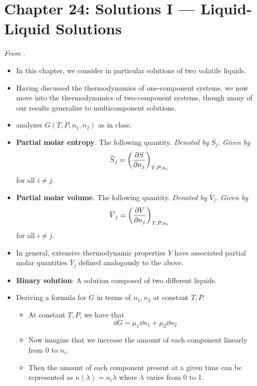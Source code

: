 \documentclass[../notes.tex]{subfiles}
\begin{document}
\section{Chapter 24: Solutions I --- Liquid-Liquid Solutions}
\emph{From \textcite{bib:McQuarrieSimon}.}
\begin{itemize}
    \item {}In this chapter, we consider in particular solutions of two volatile liquids.
    \item Having discussed the thermodynamics of one-component systems, we now move into the thermodynamics of two-component systems, though many of our results generalize to multicomponent solutions.
    \item \textcite{bib:McQuarrieSimon} analyzes $G(T,P,n_1,n_2)$ as in class.
    \item \textbf{Partial molar entropy}. The following quantity. \emph{Denoted by} $\overline{S}_j$. \emph{Given by}
    \begin{equation*}
        \overline{S}_j = \left( \pdv{S}{n_j} \right)_{T,P,n_i}
    \end{equation*}
    for all $i\neq j$.
    \item \textbf{Partial molar volume}. The following quantity. \emph{Denoted by} $\overline{V}_j$. \emph{Given by}
    \begin{equation*}
        \overline{V}_j = \left( \pdv{V}{n_j} \right)_{T,P,n_i}
    \end{equation*}
    for all $i\neq j$.
    \item In general, extensive thermodynamic properties $Y$ have associated partial molar quantities $\overline{Y}_j$ defined analogously to the above.
    \item \textbf{Binary solution}: A solution composed of two different liquids.
    \item {}Deriving a formula for $G$ in terms of $n_1,n_2$ at constant $T,P$.
    \begin{itemize}
        \item At constant $T,P$, we have that
        \begin{equation*}
            \dd{G} = \mu_1\dd{n_1}+\mu_2\dd{n_2}
        \end{equation*}
        \item Now imagine that we increase the amount of each component linearly from 0 to $n_i$.
        \item Then the amount of each component present at a given time can be represented as $n(\lambda)=n_i\lambda$ where $\lambda$ varies from 0 to 1.

\end{itemize}
\end{itemize}
\end{document}
